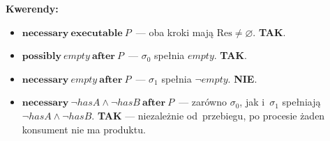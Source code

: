 \documentclass[11pt,a4paper]{article}
\newcommand{\aft}{\textbf{after}}
\newcommand{\necessary}{\textbf{necessary}}
\newcommand{\possibly}{\textbf{possibly}}
\newcommand{\executable}{\textbf{executable}}
\begin{document}
\medskip
\noindent\textbf{Kwerendy:}
\begin{itemize}
  \item $\necessary\ \executable\ P$~---
    oba kroki mają $\mathrm{Res} \neq \varnothing$. \textbf{TAK}.

  \item $\possibly\ \mathit{empty}\ \aft\ P$~---
    $\sigma_0$ spełnia $\mathit{empty}$. \textbf{TAK}.

  \item $\necessary\ \mathit{empty}\ \aft\ P$~---
    $\sigma_1$ spełnia $\neg\mathit{empty}$. \textbf{NIE}.

  \item $\necessary\ \neg\mathit{hasA} \land \neg\mathit{hasB}\ \aft\ P$~---
    zarówno $\sigma_0$, jak i~$\sigma_1$ spełniają $\neg\mathit{hasA} \land \neg\mathit{hasB}$.
    \textbf{TAK} --- niezależnie od~przebiegu, po procesie żaden konsument
    nie ma produktu.
\end{itemize}
\end{document}
